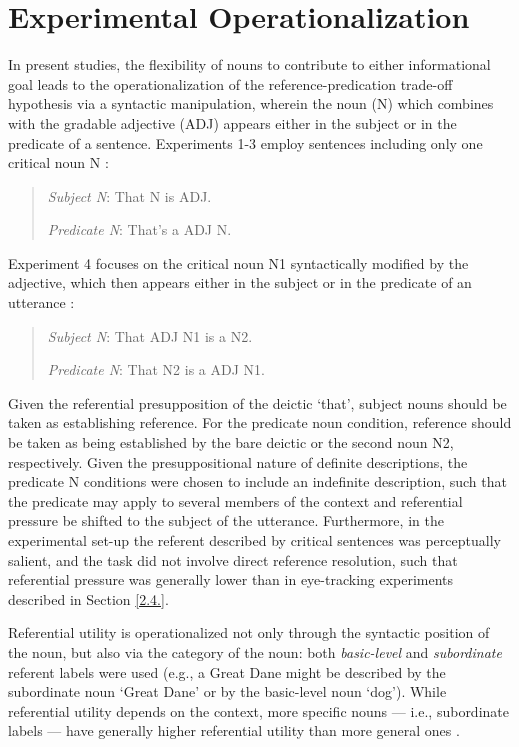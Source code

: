 \section{Experimental Operationalization}
\label{3.2.}
In present studies, the flexibility of nouns to contribute to either informational goal leads to the operationalization of the reference-predication trade-off hypothesis via a syntactic manipulation, wherein the noun (N) which combines with the gradable adjective (ADJ) appears either in the subject or in the predicate of a sentence. Experiments 1-3 employ sentences including only one critical noun N \parencite{tessler2020}:
\begin{quotation}
	\textit{Subject N}: That N is ADJ. 
	
	\textit{Predicate N}: That's a ADJ N.
\end{quotation}
Experiment 4 focuses on the critical noun N1 syntactically modified by the adjective, which then appears either in the subject or in the predicate of an utterance \parencite{TesslerEtAl2020AMLaP}: 
\begin{quotation}
	\textit{Subject N}: That ADJ N1 is a N2. 
	 
	\textit{Predicate N}: That N2 is a ADJ N1.
\end{quotation} 
Given the referential presupposition of the deictic `that', subject nouns should be taken as establishing reference.  For the predicate noun condition, reference should be taken as being established by the bare deictic or the second noun N2, respectively. Given the presuppositional nature of definite descriptions, the predicate N conditions were chosen to include an indefinite description, such that the predicate may apply to several members of the context and referential pressure be shifted to the subject of the utterance. Furthermore, in the experimental set-up the referent described by critical sentences was perceptually salient, and the task did not involve direct reference resolution, such that referential pressure was generally lower than in eye-tracking experiments described in Section \ref{2.4.}.

Referential utility is operationalized not only through the syntactic position of the noun, but also via the category of the noun: both \emph{basic-level} and \emph{subordinate} referent labels were used (e.g., a Great Dane might be described by the subordinate noun `Great Dane' or by the basic-level noun `dog'). While referential utility depends on the context, more specific nouns --- i.e., subordinate labels --- have generally higher referential utility than more general ones \parencite{graf2016animal}. 

